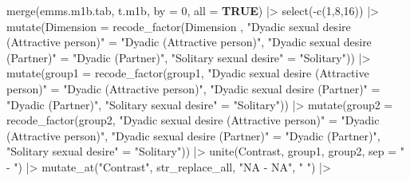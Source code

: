 \documentclass[
  bookmarksnumbered]{article}
\newenvironment{Shaded}{\begin{snugshade}}{\end{snugshade}}
\newcommand{\AttributeTok}[1]{\textcolor[rgb]{0.80,0.80,0.80}{#1}}
\newcommand{\ConstantTok}[1]{\textcolor[rgb]{0.86,0.64,0.64}{\textbf{#1}}}
\newcommand{\DecValTok}[1]{\textcolor[rgb]{0.86,0.86,0.80}{#1}}
\newcommand{\FunctionTok}[1]{\textcolor[rgb]{0.94,0.94,0.56}{#1}}
\newcommand{\NormalTok}[1]{\textcolor[rgb]{0.80,0.80,0.80}{#1}}
\newcommand{\OtherTok}[1]{\textcolor[rgb]{0.94,0.94,0.56}{#1}}
\newcommand{\SpecialCharTok}[1]{\textcolor[rgb]{0.86,0.64,0.64}{#1}}
\newcommand{\StringTok}[1]{\textcolor[rgb]{0.80,0.58,0.58}{#1}}
\begin{document}
\begin{Shaded}
\begin{Highlighting}[]
\FunctionTok{merge}\NormalTok{(emms.m1b.tab, t.m1b, }\AttributeTok{by =} \DecValTok{0}\NormalTok{, }\AttributeTok{all =} \ConstantTok{TRUE}\NormalTok{) }\SpecialCharTok{|\textgreater{}}
  \FunctionTok{select}\NormalTok{(}\SpecialCharTok{{-}}\FunctionTok{c}\NormalTok{(}\DecValTok{1}\NormalTok{,}\DecValTok{8}\NormalTok{,}\DecValTok{16}\NormalTok{)) }\SpecialCharTok{|\textgreater{}} 
  \FunctionTok{mutate}\NormalTok{(}\AttributeTok{Dimension =} \FunctionTok{recode\_factor}\NormalTok{(Dimension   ,}
                                \StringTok{"Dyadic sexual desire (Attractive person)"} \OtherTok{=} 
                                  \StringTok{"Dyadic (Attractive person)"}\NormalTok{,}
                                \StringTok{"Dyadic sexual desire (Partner)"} \OtherTok{=} 
                                  \StringTok{"Dyadic (Partner)"}\NormalTok{,}
                                \StringTok{"Solitary sexual desire"} \OtherTok{=} 
                                  \StringTok{"Solitary"}\NormalTok{)) }\SpecialCharTok{|\textgreater{}}
  \FunctionTok{mutate}\NormalTok{(}\AttributeTok{group1 =} \FunctionTok{recode\_factor}\NormalTok{(group1,}
                                \StringTok{"Dyadic sexual desire (Attractive person)"} \OtherTok{=} 
                                  \StringTok{"Dyadic (Attractive person)"}\NormalTok{,}
                                \StringTok{"Dyadic sexual desire (Partner)"} \OtherTok{=} 
                                  \StringTok{"Dyadic (Partner)"}\NormalTok{,}
                                \StringTok{"Solitary sexual desire"} \OtherTok{=} 
                                  \StringTok{"Solitary"}\NormalTok{)) }\SpecialCharTok{|\textgreater{}}
  \FunctionTok{mutate}\NormalTok{(}\AttributeTok{group2 =} \FunctionTok{recode\_factor}\NormalTok{(group2,}
                                \StringTok{"Dyadic sexual desire (Attractive person)"} \OtherTok{=} 
                                  \StringTok{"Dyadic (Attractive person)"}\NormalTok{,}
                                \StringTok{"Dyadic sexual desire (Partner)"} \OtherTok{=} 
                                  \StringTok{"Dyadic (Partner)"}\NormalTok{,}
                                \StringTok{"Solitary sexual desire"} \OtherTok{=} 
                                  \StringTok{"Solitary"}\NormalTok{)) }\SpecialCharTok{|\textgreater{}} 
  \FunctionTok{unite}\NormalTok{(Contrast, group1, group2, }\AttributeTok{sep =} \StringTok{" {-} "}\NormalTok{) }\SpecialCharTok{|\textgreater{}}
  \FunctionTok{mutate\_at}\NormalTok{(}\StringTok{"Contrast"}\NormalTok{, str\_replace\_all, }\StringTok{"NA {-} NA"}\NormalTok{, }\StringTok{" "}\NormalTok{) }\SpecialCharTok{|\textgreater{}} 

\end{Highlighting}
\end{Shaded}
\end{document}
